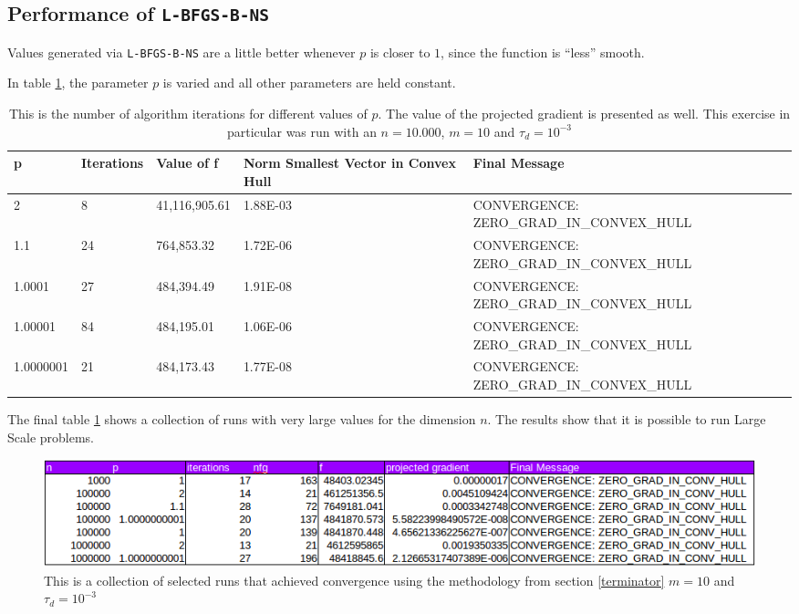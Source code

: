 \subsection{Performance of \texttt{L-BFGS-B-NS}}

Values generated via \texttt{L-BFGS-B-NS} are a little better whenever $p$ is closer to $1$, since the function is ``less'' smooth.

In table \ref{pmtable}, the parameter $p$ is varied and all other parameters are held constant.

\begin{center}
  \begin{table}
    \label{pmtable}
    \begin{tabular}{|l|l|l|p{3.5cm}|p{6cm}|}
      \hline
      p & Iterations & Value of f & Norm Smallest Vector in Convex Hull & Final Message\\ \hline
      2 & 8 & 41,116,905.61 & 1.88E-03 & CONVERGENCE: ZERO\_GRAD\_IN\_CONVEX\_HULL \\
      1.1 & 24 & 764,853.32 & 1.72E-06 & CONVERGENCE: ZERO\_GRAD\_IN\_CONVEX\_HULL \\ 
      1.0001 & 27 & 484,394.49 & 1.91E-08 & CONVERGENCE: ZERO\_GRAD\_IN\_CONVEX\_HULL \\ 
      1.00001 & 84 & 484,195.01 & 1.06E-06 & CONVERGENCE: ZERO\_GRAD\_IN\_CONVEX\_HULL \\ 
      1.0000001 & 21 & 484,173.43 & 1.77E-08 & CONVERGENCE: ZERO\_GRAD\_IN\_CONVEX\_HULL \\ \hline
    \end{tabular}
    \caption[Number of algorithm iterations changing $p$]{This is the number of algorithm iterations for different values of $p$. The value of the projected gradient is presented as well. This exercise in particular was run with an $n = 10.000$, $m = 10$ and $\tau_d = 10^{-3}$}
  \end{table}
\end{center}

The final table \ref{sel} shows a collection of runs with very large values for the dimension $n$. The results show that it is possible to run Large Scale problems.

\begin{figure}
\begin{center}
\includegraphics[scale=0.50]{Figures/SelectedRuns.png}
\caption[Selected Runs changing dimensions using $m$ = 10]{This is a collection of selected runs that achieved convergence using the methodology from section \eqref{terminator} $m = 10$ and $\tau_d = 10^{-3}$}
\label{sel}
\end{center}
\end{figure}

